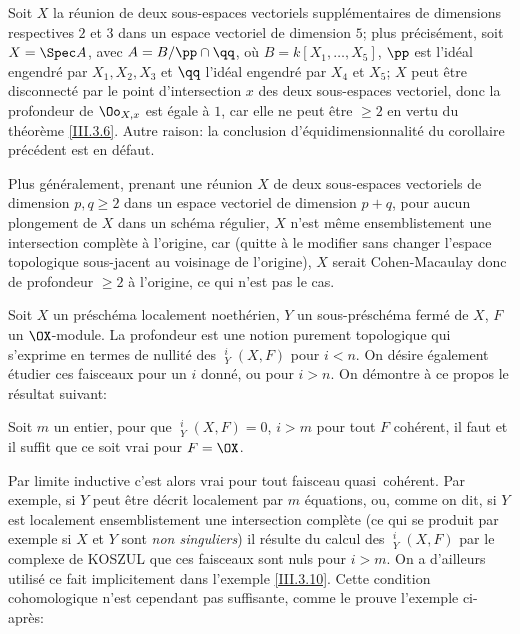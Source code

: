 \begin{exemple} \label{III.3.10}
Soit $X$ la r\'eunion de deux sous-espaces vectoriels suppl\'ementaires de dimensions respectives $2$ et $3$ dans un espace vectoriel de dimension $5$; plus pr\'ecis\'ement, soit $X=\Spec A$, avec $A=B/{\pp \cap \qq}$, o\`u $B=k[X_1, \ldots, X_5]$, $\pp$ est l'id\'eal engendr\'e par $X_1, X_2, X_3$ et $\qq$ l'id\'eal engendr\'e par $X_4$ et $X_5$; $X$ peut \^etre disconnect\'e par le point d'intersection $x$ des deux sous-espaces vectoriel, donc la profondeur de $\Oo_{X, x}$ est \'egale \`a $1$, car elle ne peut \^etre $\geq 2$ en vertu du th\'eor\`eme \ref{III.3.6}. Autre raison: la conclusion d'\'equidimensionnalit\'e du corollaire pr\'ec\'edent est en d\'efaut.

Plus g\'en\'eralement, prenant une r\'eunion $X$ de deux sous-espaces vectoriels de dimension $p, q\geq 2$ dans un espace vectoriel de dimension $p+q$, pour aucun plongement de $X$ dans un sch\'ema r\'egulier, $X$ n'est m\^eme ensemblistement une intersection compl\`ete \`a l'origine, car (quitte \`a le modifier sans changer l'espace topologique sous-jacent au voisinage de l'origine), $X$ serait Cohen-Macaulay donc de profondeur $\geq 2$ \`a l'origine, ce qui n'est pas le cas.
\end{exemple}

\begin{remarque} \label{III.3.11}
Soit $X$ un pr\'esch\'ema localement noeth\'erien, $Y$ un sous-pr\'esch\'ema ferm\'e de $X$, $F$ un $\OX$-module. La profondeur est une notion purement topologique qui s'exprime en termes de nullit\'e des $\mathop{\underline{\mathrm{H}}}\nolimits_Y^i(X, F)$ pour $i<n$. On d\'esire \'egalement \'etudier ces faisceaux pour un $i$ donn\'e, ou pour $i>n$. On d\'emontre \`a ce propos le r\'esultat suivant:
\end{remarque}

\begin{lemme} \label{III.3.12}
Soit $m$ un entier, pour que $\mathop{\underline{\mathrm{H}}}\nolimits_Y^i(X, F)=0$, $i>m$ pour tout $F$ coh\'erent, il faut et il suffit que ce soit vrai pour $F=\OX$.
\end{lemme}

Par limite inductive c'est alors vrai pour tout faisceau quasi~coh\'erent. Par exemple, si $Y$ peut \^etre d\'ecrit localement par $m$ \'equations, ou, comme on dit, si $Y$ est localement ensemblistement une intersection compl\`ete (ce qui se produit par exemple si $X$ et $Y$ sont \emph{non singuliers}) il r\'esulte du calcul des $\mathop{\underline{\mathrm{H}}}\nolimits_Y^i(X, F)$ par le complexe de KOSZUL que ces faisceaux sont nuls pour $i>m$. On a d'ailleurs utilis\'e ce fait implicitement dans l'exemple \ref{III.3.10}. Cette condition cohomologique n'est cependant pas suffisante, comme le prouve l'exemple ci-apr\`es:

